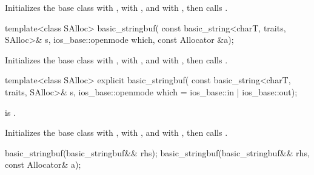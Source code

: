 \begin{itemdescr}
\pnum
\effects
Initializes the base class with ,
 with , and
 with ,
then calls .
\end{itemdescr}

%
\begin{itemdecl}
template<class SAlloc>
  basic_stringbuf(
    const basic_string<charT, traits, SAlloc>& s,
    ios_base::openmode which, const Allocator &a);
\end{itemdecl}

\begin{itemdescr}
\pnum
\effects
Initializes the base class with ,
 with , and
 with ,
then calls .
\end{itemdescr}

%
\begin{itemdecl}
template<class SAlloc>
  explicit basic_stringbuf(
    const basic_string<charT, traits, SAlloc>& s,
    ios_base::openmode which = ios_base::in | ios_base::out);
\end{itemdecl}

\begin{itemdescr}
\pnum
\constraints
{} is .

\pnum
\effects
Initializes the base class with ,
 with , and
 with ,
then calls .
\end{itemdescr}

%
\begin{itemdecl}
basic_stringbuf(basic_stringbuf&& rhs);
basic_stringbuf(basic_stringbuf&& rhs, const Allocator& a);
\end{itemdecl}

